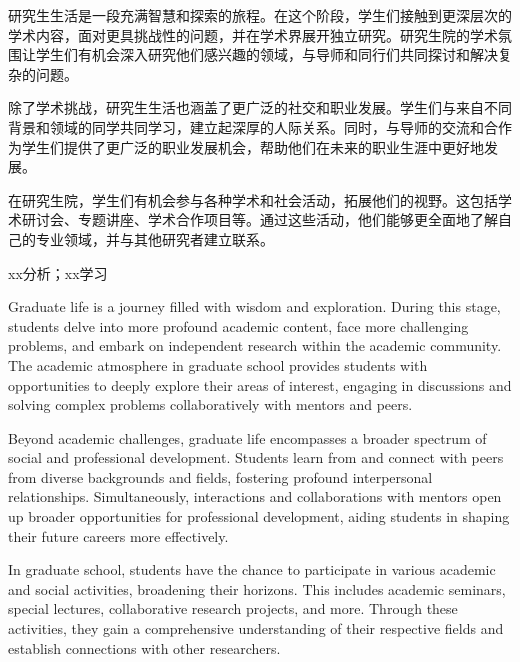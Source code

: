 \begin{abstractCN}
\setlength{\baselineskip}{23pt} %


研究生生活是一段充满智慧和探索的旅程。在这个阶段，学生们接触到更深层次的学术内容，面对更具挑战性的问题，并在学术界展开独立研究。研究生院的学术氛围让学生们有机会深入研究他们感兴趣的领域，与导师和同行们共同探讨和解决复杂的问题。

除了学术挑战，研究生生活也涵盖了更广泛的社交和职业发展。学生们与来自不同背景和领域的同学共同学习，建立起深厚的人际关系。同时，与导师的交流和合作为学生们提供了更广泛的职业发展机会，帮助他们在未来的职业生涯中更好地发展。

在研究生院，学生们有机会参与各种学术和社会活动，拓展他们的视野。这包括学术研讨会、专题讲座、学术合作项目等。通过这些活动，他们能够更全面地了解自己的专业领域，并与其他研究者建立联系。


\end{abstractCN}


\begin{keywordCN}
xx分析；xx学习
\end{keywordCN}

\begin{abstractEN}
\setlength{\baselineskip}{23pt} %
Graduate life is a journey filled with wisdom and exploration. During this stage, students delve into more profound academic content, face more challenging problems, and embark on independent research within the academic community. The academic atmosphere in graduate school provides students with opportunities to deeply explore their areas of interest, engaging in discussions and solving complex problems collaboratively with mentors and peers.

Beyond academic challenges, graduate life encompasses a broader spectrum of social and professional development. Students learn from and connect with peers from diverse backgrounds and fields, fostering profound interpersonal relationships. Simultaneously, interactions and collaborations with mentors open up broader opportunities for professional development, aiding students in shaping their future careers more effectively.

In graduate school, students have the chance to participate in various academic and social activities, broadening their horizons. This includes academic seminars, special lectures, collaborative research projects, and more. Through these activities, they gain a comprehensive understanding of their respective fields and establish connections with other researchers.
\end{abstractEN}

